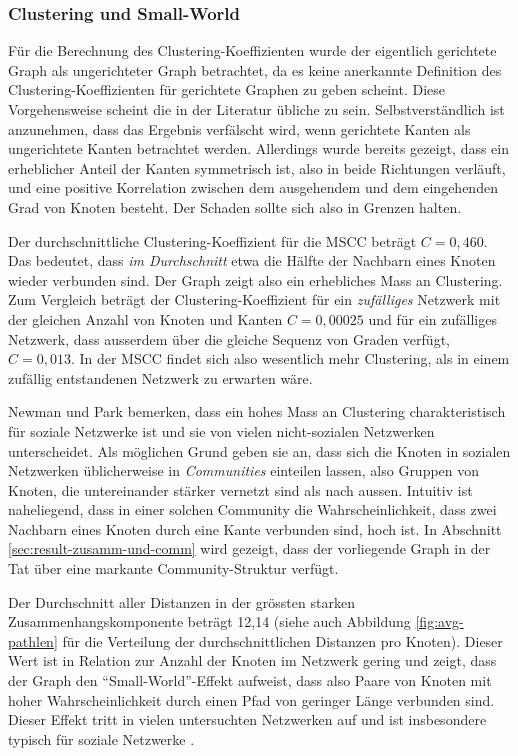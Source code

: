 \subsubsection{Clustering und Small-World}
\label{sec:clustering-und-small}

F\"ur die Berechnung des Clustering-Koeffizienten wurde der eigentlich
gerichtete Graph als ungerichteter Graph betrachtet, da es keine
anerkannte Definition des Clustering-Koeffizienten f\"ur gerichtete
Graphen zu geben scheint. Diese Vorgehensweise scheint die in der
Literatur \"ubliche zu sein. Selbstverst\"andlich ist anzunehmen, dass
das Ergebnis verf\"alscht wird, wenn gerichtete Kanten als
ungerichtete Kanten betrachtet werden. Allerdings wurde bereits
gezeigt, dass ein erheblicher Anteil der Kanten symmetrisch ist, also
in beide Richtungen verl\"auft, und eine positive Korrelation zwischen
dem ausgehendem und dem eingehenden Grad von Knoten besteht. Der
Schaden sollte sich also in Grenzen halten.

Der durchschnittliche Clustering-Koeffizient f\"ur die MSCC betr\"agt
$C = 0,460$. Das bedeutet, dass \emph{im Durchschnitt} etwa die
H\"alfte der Nachbarn eines Knoten wieder verbunden sind. Der Graph
zeigt also ein erhebliches Mass an Clustering. Zum Vergleich betr\"agt
der Clustering-Koeffizient f\"ur ein \emph{zuf\"alliges} Netzwerk mit
der gleichen Anzahl von Knoten und Kanten $C = 0,00025$ und f\"ur ein
zuf\"alliges Netzwerk, dass ausserdem \"uber die gleiche Sequenz von
Graden verf\"ugt, $C = 0,013$. In der MSCC findet sich also wesentlich
mehr Clustering, als in einem zuf\"allig entstandenen Netzwerk zu
erwarten w\"are.

Newman und Park bemerken, dass ein hohes Mass an Clustering
charakteristisch f\"ur soziale Netzwerke ist und sie von vielen
nicht-sozialen Netzwerken unterscheidet\cite{PhysRevE.68.036122}. Als
m\"oglichen Grund geben sie an, dass sich die Knoten in sozialen
Netzwerken \"ublicherweise in \emph{Communities} einteilen lassen,
also Gruppen von Knoten, die untereinander st\"arker vernetzt sind als
nach aussen. Intuitiv ist naheliegend, dass in einer solchen Community
die Wahrscheinlichkeit, dass zwei Nachbarn eines Knoten durch eine
Kante verbunden sind, hoch ist. In Abschnitt
\ref{sec:result-zusamm-und-comm} wird gezeigt, dass der vorliegende
Graph in der Tat \"uber eine markante Community-Struktur verf\"ugt.

Der Durchschnitt aller Distanzen in der gr\"ossten starken
Zusammenhangskomponente betr\"agt 12,14 (siehe auch Abbildung
\ref{fig:avg-pathlen} f\"ur die Verteilung der durchschnittlichen
Distanzen pro Knoten). Dieser Wert ist in Relation zur Anzahl der
Knoten im Netzwerk gering und zeigt, dass der Graph den
``Small-World''-Effekt aufweist, dass also Paare von Knoten mit
hoher Wahrscheinlichkeit durch einen Pfad von geringer L\"ange
verbunden sind. Dieser Effekt tritt in vielen untersuchten Netzwerken
auf und ist insbesondere typisch f\"ur soziale Netzwerke
\cite{newman:167}.

